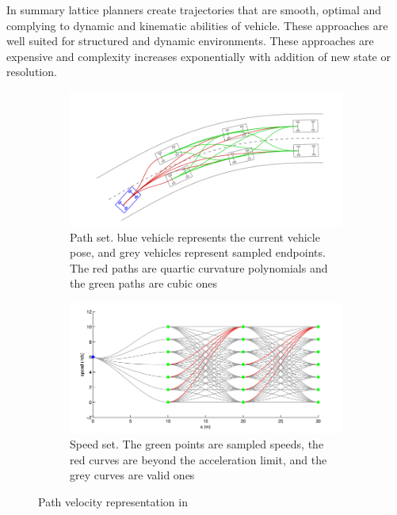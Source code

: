 In summary lattice planners create trajectories that are smooth, optimal and complying to dynamic and kinematic abilities of vehicle. These approaches are well suited for structured and dynamic environments. These approaches are expensive and complexity increases exponentially with addition of new state or resolution. 

\begin{figure}
	\centering
	\begin{subfigure}{.5\textwidth}
		\centering
		\includegraphics[width=1.0\linewidth]{Images/related_work/traj_optim_1.png}
		\caption{Path set. blue vehicle represents the current
			vehicle pose, and grey vehicles represent sampled endpoints.
			The red paths are quartic curvature polynomials and the
			green paths are cubic ones}
		\label{trajoptsub1}
	\end{subfigure}%
	\begin{subfigure}{.5\textwidth}
		\centering
		\includegraphics[width=1.0\linewidth]{Images/related_work/traj_optim_2.png}
		\caption{Speed set. The green points are sampled speeds, the
red curves are beyond the acceleration limit, and the grey
curves are valid ones}
		\label{trajoptsub2}
	\end{subfigure}
	\caption{Path velocity representation in \cite{traj_planner_optimization}}
	\label{trajopt}
\end{figure}

